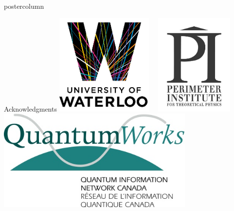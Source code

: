 \documentclass[final]{beamer} %
\begin{document}
\begin{frame}{}
\begin{columns}
\begin{column}{.33\textwidth}
\begin{beamercolorbox}[center,wd=\textwidth]{postercolumn}
\begin{minipage}[T]{.95\textwidth}
\begin{block}{\large Acknowledgments}
             \centering 
             \includegraphics[height=2in]{figures/Waterloo_Logo.png} \ \ \includegraphics[height=2in]{figures/PI_Logo.png} \ \ \includegraphics[height=2in]{figures/QuantumWorks_Logo.png}
           \end{block}

         \end{minipage}
      \end{beamercolorbox}
    \end{column}




  \end{columns}
  \end{frame}
\end{document}
